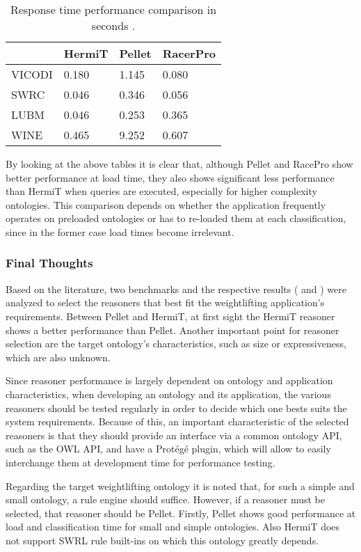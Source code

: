 \begin{table}[]
\centering
\caption{Response time performance comparison in seconds \cite{Bock2008}.}
\begin{tabular}{|l|l|l|l|}
\hline
          &  HermiT  &  Pellet  & RacerPro \\ \hline
VICODI    &    0.180  &  1.145  & 0.080 \\ \hline
SWRC      &    0.046  &  0.346  & 0.056 \\ \hline
LUBM      &    0.046  &  0.253  & 0.365 \\ \hline
WINE      &    0.465  &  9.252  & 0.607 \\ \hline
\end{tabular}
\label{tab:4}
\end{table}

By looking at the above tables it is clear that, although Pellet and RacePro show better performance at load time, they also shows significant less performance than HermiT when queries are executed, especially for higher complexity ontologies. This comparison depends on whether the application frequently operates on preloaded ontologies or has to re-loaded them at each classification, since in the former case load times become irrelevant. 


\subsubsection{Final Thoughts}

Based on the literature, two benchmarks and the respective results (\cite{Dentler2011} and \cite{Bock2008}) were analyzed to select the reasoners that best fit the weightlifting application's requirements. Between Pellet and HermiT, at first sight the HermiT reasoner shows a better performance than Pellet.  Another important point for reasoner selection are the target ontology's characteristics, such as size or expressiveness, which are also unknown. 

Since reasoner performance is largely dependent on ontology and application characteristics, when developing an ontology and its application, the various reasoners should be tested regularly in order to decide which one bests suits the system requirements. Because of this, an important characteristic of the selected reasoners is that they should provide an interface via a common ontology API, such as the OWL API, and have a Protégé plugin, which will allow to easily interchange them at development time for performance testing. 

Regarding the target weightlifting ontology it is noted that, for such a simple and small ontology, a rule engine should suffice. However, if a reasoner must be selected, that reasoner should be Pellet. Firstly, Pellet shows good performance at load and classification time for small and simple ontologies. Also HermiT does not support SWRL rule built-ins on which this ontology greatly depends.
